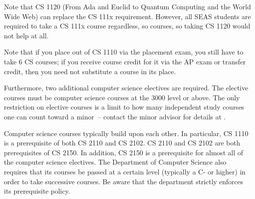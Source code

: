 \documentclass[10pt,letter,twocolumn]{book}
\newenvironment{numlist}{
\begin{enumerate}
\setlength{\itemsep}{0pt}
\setlength{\parskip}{0pt}}
{\end{enumerate}}
\newcommand{\mysection}[1]{\section{#1}\renewcommand{\rightmark}{#1}}
\begin{document}
Note that CS 1120 (From Ada and Euclid to Quantum Computing and the
World Wide Web) can replace the CS 111x requirement.  However, all
SEAS students are required to take a CS 111x course regardless, so
courses, so taking CS 1120 would not help at all.

Note that if you place out of CS 1110 via the placement exam,
you still have to take 6 CS courses; if you receive course credit for
it via the AP exam or transfer credit, then you need not substitute a
course in its place.

Furthermore, two additional computer science electives are
required. The elective courses must be computer science courses at the
3000 level or above. The only restriction on elective courses is a
limit to how many independent study courses one can count toward a
minor~-- contact the minor advisor for details at
\csminoradvisoremail.

Computer science courses typically build upon each other. In
particular, CS 1110 is a prerequisite of both CS 2110 and
CS 2102. CS 2110 and CS 2102 are both prerequisites
of CS 2150. In addition, CS 2150 is a prerequisite for
almost all of the computer science electives. The Department of
Computer Science also requires that its courses be passed at a certain
level (typically a C- or higher) in order to take successive
courses. Be aware that the department strictly enforces its
prerequisite policy.

 
%
%
%
%
%
%
%
\end{document}
